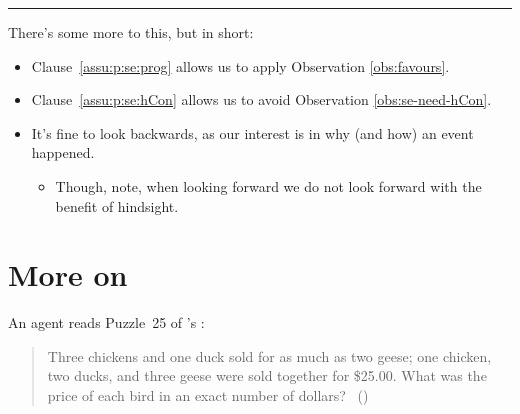 \documentclass[10pt]{article}
\newcommand\lLine{{\color{lightgray} \noindent\rule{\textwidth}{0.4pt}}}
\newcommand{\hand}{\ding{43}}
\begin{document}
\begin{comment}
  Split perspective.
  Important.
  Weak assumption about events in progress.
  Only that there is some possible event.
  With hindsight, fix the particular event which happened.
\end{comment}

\lLine

\begin{note}
  There's some more to this, but in short:

  \begin{itemize}
  \item
    Clause~\ref{assu:p:se:prog} allows us to apply Observation \ref{obs:favours}.
  \item
    Clause~\ref{assu:p:se:hCon} allows us to avoid Observation \ref{obs:se-need-hCon}.
  \end{itemize}

  \begin{itemize}
  \item[\hand]
    It's fine to look backwards, as our interest is in why (and how) an event happened.
    \begin{itemize}
    \item
      Though, note, when looking forward we do not look forward with the benefit of hindsight.
    \end{itemize}
  \end{itemize}
\end{note}

\vfill


\newpage

\section{More on }

\begin{note}
  \begin{scenario}[Paltry]
    \label{scen:fc:chick}%
    An agent reads Puzzle~25 of \citeauthor{Dudeney:1995aa}'s :
    \begin{quote}
      Three chickens and one duck sold for as much as two geese; one chicken, two ducks, and three geese were sold together for \$25.00. What was the price of each bird in an exact number of dollars?%
      \mbox{ }\hfill\mbox{(\citeyear[9]{Dudeney:1995aa})}
    \end{quote}
    \vspace{-\baselineskip}
  \end{scenario}
\end{note}
\end{document}
